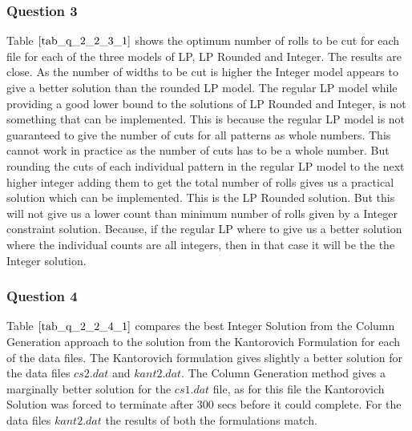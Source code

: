 \documentclass[twoside,12pt]{article}
\begin{document}
\subsubsection{Question 3}
\label{p1_s2_q3}
Table $\eqref{tab_q_2_2_3_1}$ shows the optimum number of rolls to be cut for each file for each of the three models of LP, LP Rounded and Integer. The results are close. As the number of widths to be cut is higher the Integer model appears to give a better solution than the rounded LP model. The regular LP model while providing a good lower bound to the solutions of LP Rounded and Integer, is not something that can be implemented. This is because the regular LP model is not guaranteed  to give the number of cuts for all patterns as whole numbers. This cannot work in practice as the number of cuts has to be a whole number. But rounding the cuts of each individual pattern in the regular LP model to the next higher integer adding them to get the total number of rolls gives us a practical solution which can be implemented. This is the LP Rounded solution. But this will not give us a lower count than minimum number of rolls given by a Integer constraint solution. Because, if the regular LP where to give us a better solution where the individual counts are all integers, then in that case it will be the the Integer solution. 

\begin{table}[h]
\centering
{}
	\caption[]{Compare No. Rolls to be cut - LP, LP Rounded and Integer approaches }
	\label{tab_q_2_2_3_1}
\end{table}


\subsubsection{Question 4}
\label{p1_s2_q4}

Table $\eqref{tab_q_2_2_4_1}$ compares the best Integer Solution from the Column Generation approach to the solution from the Kantorovich Formulation for each of the data files. The Kantorovich formulation gives slightly a better solution for the data files $cs2.dat$ and $kant2.dat$. The Column Generation method gives a marginally better solution for the $cs1.dat$ file, as for this file the Kantorovich Solution was forced to terminate after 300 secs before it could complete. For the data files $kant2.dat$ the results of both the formulations match.
\end{document}
